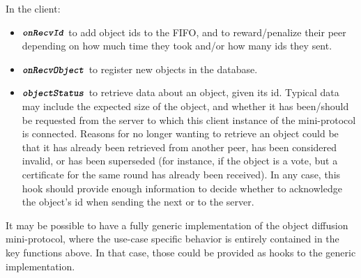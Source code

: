 In the client:
\begin{itemize}
  \item $\textbf{\texttt{\textit{onRecvId}}}$ to add object ids to the FIFO, and to reward/penalize their peer depending on how much time they took and/or how many ids they sent.
  \item $\textbf{\texttt{\textit{onRecvObject}}}$ to register new objects in the database.
  \item $\textbf{\texttt{\textit{objectStatus}}}$ to retrieve data about an object, given its id.
  Typical data may include the expected size of the object, and whether it has been/should be requested from the server to which this client instance of the mini-protocol is connected.
  Reasons for no longer wanting to retrieve an object could be that it has already been retrieved from another peer, has been considered invalid, or has been superseded (for instance, if the object is a vote, but a certificate for the same round has already been received).
  In any case, this hook should provide enough information to decide whether to acknowledge the object's id when sending the next \MsgRequestObjIdsB{} or \MsgRequestObjIdsNB{} to the server.
\end{itemize}

It may be possible to have a fully generic implementation of the object diffusion mini-protocol, where the use-case specific behavior is entirely contained in the key functions above.
In that case, those could be provided as hooks to the generic implementation.

